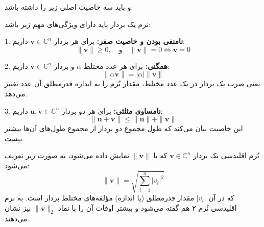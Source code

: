 و باید سه خاصیت اصلی زیر را داشته باشد:
\begin{nokteh}
	نرم یک بردار باید دارای ویژگی‌های مهم زیر باشد:
	
	1. \textbf{ نامنفی بودن و خاصیت صفر:}  
	برای هر بردار $\mathbf{v} \in \mathbb{C}^n$ داریم:
	\[
	\|\mathbf{v}\| \geq 0, \quad \text{و} \quad \|\mathbf{v}\| = 0 \iff \mathbf{v} = 0
	\]
	
	2. \textbf{همگنی:}  
	برای هر عدد مختلط $\alpha$ و بردار $\mathbf{v} \in \mathbb{C}^n$ داریم:
	\[
	\|\alpha \mathbf{v}\| = |\alpha| \|\mathbf{v}\|
	\]
	یعنی ضرب یک بردار در یک عدد مختلط، مقدار نُرم را به اندازه قدرمطلق آن عدد تغییر می‌دهد.
	
	3. \textbf{نامساوی مثلثی:}  
	برای هر دو بردار $\mathbf{u}, \mathbf{v} \in \mathbb{C}^n$ داریم:
	\[
	\|\mathbf{u} + \mathbf{v}\| \leq \|\mathbf{u}\| + \|\mathbf{v}\|
	\]
	این خاصیت بیان می‌کند که طول مجموع دو بردار از مجموع طول‌های آن‌ها بیشتر نیست.
\end{nokteh}
\begin{definition}[نُرم اقلیدسی]
	نُرم  اقلیدسی یک بردار $\mathbf{v} \in \mathbb{C}^n$ که با $\|\mathbf{v}\|$ نمایش داده می‌شود، به صورت زیر تعریف می‌شود:
	\[
	\|\mathbf{v}\| = \sqrt{\sum_{i=1}^{n} |v_i|^2}
	\]
	که در آن $|v_i|$ مقدار قدرمطلق (یا اندازه) مؤلفه‌های مختلط بردار است.
	به نرم اقلیدسی نُرم ۲ هم گفته می‌شود و بیشتر اوقات آن را با نماد 
	$\|\mathbf{v}\|_2$
	نیز نشان می‌دهند.
\end{definition}

